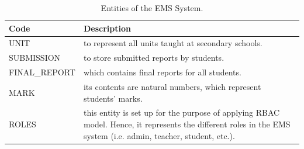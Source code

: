 \begin{table}[bth]
\centering
\caption{Entities of the EMS System.}
\small
{}
\begin{tabular}{p{0.8 in} p{6 in}} \hline 
\hline
Code & Description\\\hline\hline

UNIT& to represent all units taught at secondary schools. \\ 
SUBMISSION& to store submitted reports by students. \\ 
FINAL\_REPORT& which contains final reports for all students. \\ 
MARK& its contents are natural numbers, which represent students’ marks. \\ 
ROLES& this entity is set up for the purpose of applying RBAC model.  Hence, it represents the different roles in the EMS system (i.e. admin, teacher, student, etc.).\\ \hline\hline
\end{tabular}
\label{tab:otherentities}
\end{table}




